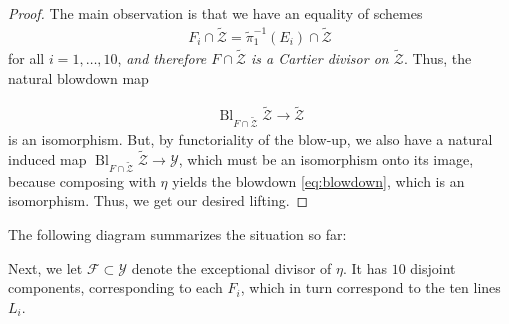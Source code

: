 \documentclass[12pt,reqno]{amsart}
\DeclareMathOperator{\id}{id}
\DeclareMathOperator{\Bl}{Bl}
\renewcommand{\to}{{\longrightarrow}}
\numberwithin{equation}{section}
\newcommand{\td}{\widetilde}
\begin{document}
\begin{proof}
  The main observation is that we have an equality of schemes
  \begin{align}
    \label{eq:Cartier}
    F_i \cap \widetilde{\mathcal{Z}} = \widetilde{\pi}_{1}^{-1}(E_i) \cap \widetilde{\mathcal{Z}}
  \end{align}
  for all $i=1, \dots, 10$, {\sl and therefore
    $F \cap \widetilde{\mathcal{Z}}$ is a Cartier divisor on
    $\widetilde{\mathcal{Z}}$}.  Thus, the natural blowdown map

  \begin{align}
    \label{eq:blowdown}
    \Bl_{F \cap \td{\mathcal{Z}}}\td{\mathcal{Z}} \to \td{\mathcal{Z}}
  \end{align}
  is an isomorphism.  But, by functoriality of the blow-up, we also
  have a natural induced map
  $\Bl_{F \cap \td{\mathcal{Z}}}\td{\mathcal{Z}} \to \mathcal{Y}$,
  which must be an isomorphism onto its image, because composing with
  $\eta$ yields the blowdown \eqref{eq:blowdown}, which is an
  isomorphism.  Thus, we get our desired lifting.
\end{proof}

The following diagram summarizes the situation so far:

\begin{center}
\end{center}

Next, we let $\mathcal{F} \subset \mathcal{Y}$ denote the exceptional
divisor of $\eta$. It has $10$ disjoint components, corresponding to
each $F_{i}$, which in turn correspond to the ten lines $L_{i}$.
\end{document}
